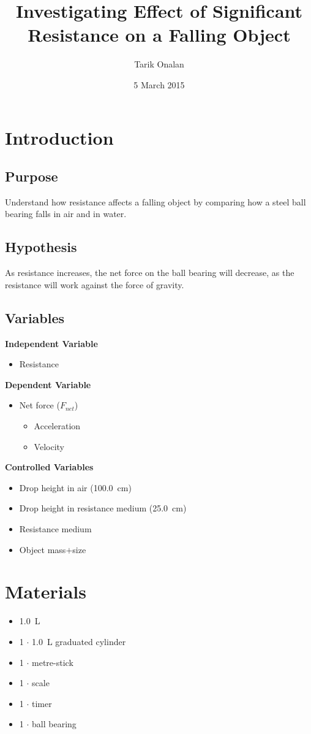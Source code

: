 \documentclass[a4paper]{article}
\title{Investigating Effect of Significant Resistance on a Falling Object}
\date{5 March 2015}
\author{Tarik Onalan}
\begin{document}
    \maketitle
    \section{Introduction}
        \subsection{Purpose}
            Understand how resistance affects a falling object by comparing how a
            steel ball bearing falls in air and in water.
        \subsection{Hypothesis}
            As resistance increases, the net force on the ball bearing will decrease,
            as the resistance will work against the force of gravity.
        \subsection{Variables}
            \textbf{Independent Variable}
            \begin{itemize}
                \item Resistance
            \end{itemize}
            \textbf{Dependent Variable}
            \begin{itemize}
                \item Net force ($F_{net}$)
                \begin{itemize}
                    \item Acceleration
                    \item Velocity
                \end{itemize}
            \end{itemize}
            \textbf{Controlled Variables}
            \begin{itemize}
                \item Drop height in air (\SI{100.0}{\cm})
                \item Drop height in resistance medium (\SI{25.0}{\cm})
                \item Resistance medium
                \item Object mass$+$size
            \end{itemize}
    \section{Materials}
        \begin{itemize}
            \item \SI{1.0}{\L} 
            \item 1 $\cdot$ \SI{1.0}{\L} graduated cylinder
            \item 1 $\cdot$ metre-stick
            \item 1 $\cdot$ scale
            \item 1 $\cdot$ timer
            \item 1 $\cdot$ ball bearing
        \end{itemize}
\end{document}
